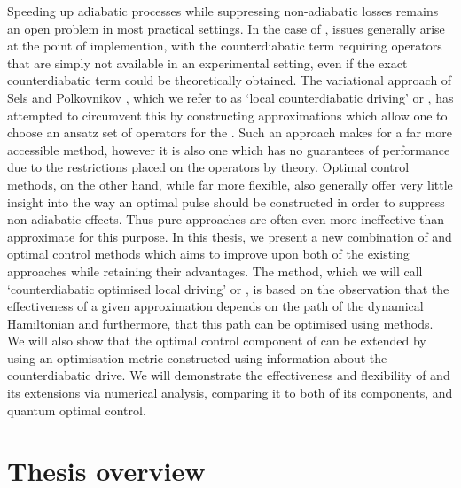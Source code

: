 Speeding up adiabatic processes while suppressing non-adiabatic losses remains an open problem in most practical settings. In the case of , issues generally arise at the point of implemention, with the counterdiabatic term requiring operators that are simply not available in an experimental setting, even if the exact counterdiabatic term could be theoretically obtained. The variational approach of Sels and Polkovnikov \cite{sels_minimizing_2017}, which we refer to as `local counterdiabatic driving' or , has attempted to circumvent this by constructing approximations which allow one to choose an ansatz set of operators for the . Such an approach makes for a far more accessible method, however it is also one which has no guarantees of performance due to the restrictions placed on the operators by  theory. Optimal control methods, on the other hand, while far more flexible, also generally offer very little insight into the way an optimal pulse should be constructed in order to suppress non-adiabatic effects. Thus pure  approaches are often even more ineffective than approximate  for this purpose. In this thesis, we present a new combination of  and optimal control methods which aims to improve upon both of the existing approaches while retaining their advantages. The method, which we will call `counterdiabatic optimised local driving' or  \cite{cepaite_counterdiabatic_2023}, is based on the observation that the effectiveness of a given  approximation depends on the path of the dynamical Hamiltonian and furthermore, that this path can be optimised using  methods. We will also show that the optimal control component of  can be extended by using an optimisation metric constructed using information about the counterdiabatic drive. We will demonstrate the effectiveness and flexibility of  and its extensions via numerical analysis, comparing it to both of its components,  and quantum optimal control.

\section{Thesis overview}

